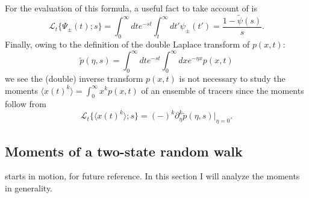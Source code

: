 \documentclass[11pt]{article}
\newcommand\be{\begin{equation}} %
\newcommand\ee{\end{equation}}   %
\newcommand\bra{\langle}
\newcommand\ket{\rangle}
\newcommand\El{\mathcal{L}}
\begin{document}
For the evaluation of this formula, a useful fact to take account of is 
\be \El_t\{ \Psi_\pm(t);s\} = \int_0^\infty dt e^{-st} \int_t^\infty dt' \psi_\pm(t') = \frac{1-\tilde{\psi}(s)}{s}. \ee
Finally, owing to the definition of the double Laplace transform of $p(x,t)$:
\be \tilde{p}(\eta,s) = \int_0^\infty dt e^{-st} \int_0^\infty dx e^{-\eta x} p(x,t)\ee
we see the (double) inverse transform $p(x,t)$ is not necessary to study the moments $\bra x(t)^k \ket = \int_0^\infty x^k p(x,t)$ of an ensemble of tracers since the moments follow from
\be \El_t\{\bra x(t)^k\ket;s\} = (-)^k\partial_\eta^k \tilde{p}(\eta,s)\Big|_{\eta=0}.\ee

\subsection{Moments of a two-state random walk}
\citet{Weeks1998} starts in motion, for future reference. 
In this section I will analyze the moments in generality.
\end{document}
